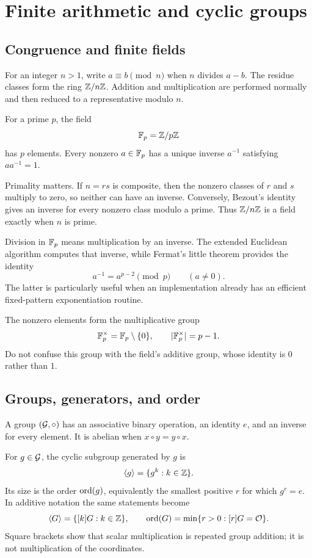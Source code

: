 \section{Finite arithmetic and cyclic groups}

\subsection{Congruence and finite fields}

For an integer $n>1$, write $a\equiv b\pmod n$ when $n$ divides $a-b$.
The residue classes form the ring $\mathbb{Z}/n\mathbb{Z}$. Addition and multiplication are
performed normally and then reduced to a representative modulo $n$.

\begin{definition}
For a prime $p$, the field
\[
  \mathbb{F}_p=\mathbb{Z}/p\mathbb{Z}
\]
has $p$ elements. Every nonzero $a\in\mathbb{F}_p$ has a unique inverse $a^{-1}$
satisfying $aa^{-1}=1$.
\end{definition}

Primality matters. If $n=rs$ is composite, then the nonzero classes of $r$
and $s$ multiply to zero, so neither can have an inverse. Conversely, Bezout's
identity gives an inverse for every nonzero class modulo a prime. Thus
$\mathbb{Z}/n\mathbb{Z}$ is a field exactly when $n$ is prime.

Division in $\mathbb{F}_p$ means multiplication by an inverse. The extended Euclidean
algorithm computes that inverse, while Fermat's little theorem provides the
identity
\[
  a^{-1}=a^{p-2}\pmod p\qquad(a\ne0).
\]
The latter is particularly useful when an implementation already has an
efficient fixed-pattern exponentiation routine.

The nonzero elements form the multiplicative group
\[
  \mathbb{F}_p^\times=\mathbb{F}_p\setminus\{0\},\qquad |\mathbb{F}_p^\times|=p-1.
\]
Do not confuse this group with the field's additive group, whose identity is
$0$ rather than $1$.

\subsection{Groups, generators, and order}

\begin{definition}[Group]
A group $(\mathcal{G},\circ)$ has an associative binary operation, an identity $e$,
and an inverse for every element. It is abelian when $x\circ y=y\circ x$.
\end{definition}

For $g\in\mathcal{G}$, the cyclic subgroup generated by $g$ is
\[
  \langle g\rangle=\{g^k:k\in\mathbb{Z}\}.
\]
Its size is the order $\operatorname{ord}(g)$, equivalently the smallest positive $r$ for
which $g^r=e$. In additive notation the same statements become
\[
  \langle G\rangle=\{[k]G:k\in\mathbb{Z}\},
  \qquad
  \operatorname{ord}(G)=\min\{r>0:[r]G=\mathcal{O}\}.
\]
Square brackets show that scalar multiplication is repeated group addition;
it is not multiplication of the coordinates.

